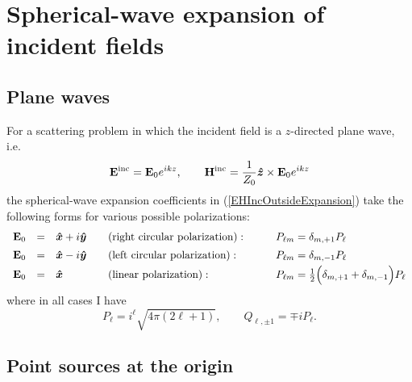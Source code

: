 \documentclass[letterpaper]{article}
\newcommand{\lm}{_{\ell m}}
\begin{document}
\section{Spherical-wave expansion of incident fields}
\label{IncidentFieldSection}

\subsection{Plane waves}
\label{PlaneWaveSection}

For a scattering problem in which the incident field
is a $z$-directed plane wave, i.e.
$$
 \mathbf{E}^{\text{\scriptsize inc}}=\mathbf{E}_0e^{ik z}, \qquad 
 \mathbf{H}^{\text{\scriptsize inc}}=\frac{1}{Z_0}\boldsymbol{\hat{z}}\times \mathbf{E}_0 e^{ik z}
$$
the spherical-wave expansion coefficients in (\ref{EHIncOutsideExpansion})
take the following forms for various possible polarizations:
$$\begin{array}{rclll}
\vb E_0 &=& \vbhat{x} + i\vbhat{y} 
 \quad &\text{(right circular polarization)}:
 \qquad &P\lm=\delta_{m,+1}P_\ell
\\[5pt]
\vb E_0 &=& \vbhat{x} - i\vbhat{y} 
 \quad &\text{(left circular polarization)}:
 \qquad &P\lm=\delta_{m,-1}P_\ell 
\\[3pt]
\vb E_0 &=& \vbhat{x}
 \quad &\text{(linear polarization)}:
 \qquad &P\lm=\frac{1}{2}\Big(\delta_{m,+1} + \delta_{m,-1}\Big)P_\ell 
\end{array}$$
where in all cases I have
$$ P_\ell = i^\ell \sqrt{4\pi(2\ell +1)}, \qquad  
   Q_{\ell, \pm 1} = \mp i P_\ell.
$$

\subsection{Point sources at the origin}
\label{PointSourceAtOriginSection}
\end{document}
